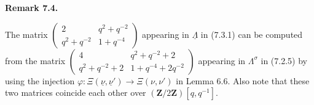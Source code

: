 \documentclass[12pt]{amsart}
\newcommand\s{\sigma}
\newcommand\vf{\varphi}
\newcommand\vL{\varLambda}
\renewcommand{\1}{\mathbb 1}
\newcommand\BZ{\mathbf Z}
\newcommand\iv{^{-1}}
\newcommand\ul{\underline}
\numberwithin{equation}{section}
\def \remark#1{\par\medskip\noindent
                \textbf{Remark #1}
                \addtocounter{thm}{1}}
\begin{document}
\remark{7.4.}
The matrix {\footnotesize $\begin{pmatrix}
               2  &   q^2 + q^{-2}  \\
               q^2 + q^{-2}  &  1 + q^{-4}
             \end{pmatrix}$}
appearing in $\ul\vL$ in (7.3.1) can be computed from the matrix
             {\footnotesize
             $\begin{pmatrix}
                4  &  q^2 + q^{-2} + 2  \\
                q^2 + q^{-2} + 2   &  1 + q^{-4} + 2q^{-2}
             \end{pmatrix}$}
appearing in $\vL^{\s}$ in (7.2.5) by using the injection
$\vf : \Xi(\ul\nu, \ul\nu') \to \Xi(\nu,\nu')$ in Lemma 6.6.    
Also note that these two matrices coincide each other over $(\BZ/2\BZ)[q, q\iv]$. 
\end{document}
